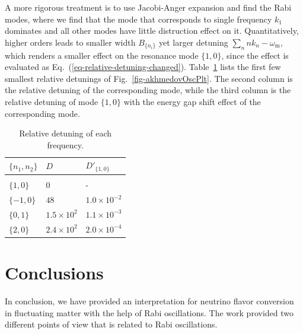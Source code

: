 \documentclass[%
reprint,
 amsmath,amssymb,
 prd,
]{revtex4-1}
\newcommand{\RD}{D}
\begin{document}
A more rigorous treatment is to use Jacobi-Anger expansion and find the Rabi modes, where we find that the mode that corresponds to single frequency $k_1$ dominates and all other modes have little distruction effect on it. Quantitatively, higher orders leads to smaller width $B_{\{n_i\}}$ yet larger detuning $\sum_{n} nk_n-\omega_{\mathrm m}$, which renders a smaller effect on the resonance mode $\{1,0\}$, since the effect is evaluated as Eq.~(\ref{eq-relative-detuning-changed}).
Table~\ref{tab-q-values-each-mode} lists the first few smallest relative detunings of Fig.~\ref{fig-akhmedovOscPlt}. The second column is the relative detuning of the corresponding mode, while the third column is the relative detuning of mode $\{1,0\}$ with the energy gap shift effect of the corresponding mode.




\begin{table}
\caption{\label{tab-q-values-each-mode}Relative detuning of each frequency.} 
\begin{ruledtabular} 
\begin{tabular}{lll} 
 $\{n_1,n_2\}$ &  $\RD$ & $\RD'_{\{1,0\}}$   \\
\hline \\
 $\{1,0\}$ & $0$ &  - \\ 
 $\{-1,0\}$ & $48$ &  $1.0\times 10^{-2}$ \\ 
 $\{0,1\}$ & $1.5\times 10^2$ &  $1.1\times 10^{-3}$  \\
 $\{2,0\}$ & $2.4\times 10^{2}$ & $2.0\times 10^{-4}$
\end{tabular} 
\end{ruledtabular} 
\end{table}





\section{\label{conclusions}Conclusions}



In conclusion, we have provided an interpretation for neutrino flavor conversion in fluctuating matter with the help of Rabi oscillations. The work provided two different points of view that is related to Rabi oscillations.
\end{document}
